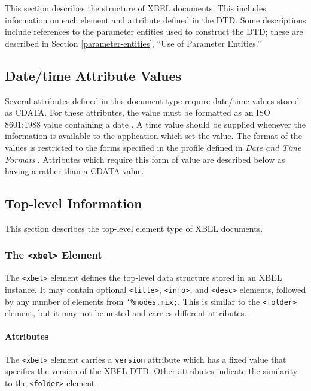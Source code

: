 \documentclass{howto}
\newcommand{\element}[1]{\texttt{<#1>}}
\newcommand{\attribute}[1]{\texttt{#1}}
\newcommand{\paramentity}[1]{\texttt{\char`\%#1;}}
\begin{document}
  This section describes the structure of XBEL documents.  This
  includes information on each element and attribute defined in the
  DTD.  Some descriptions include references to the parameter entities 
  used to construct the DTD; these are described in Section
  \ref{parameter-entities}, ``Use of Parameter Entities.''

  \subsection{Date/time Attribute Values
              \label{date-time}}

    Several attributes defined in this document type require date/time
    values stored as CDATA.  For these attributes, the value must be
    formatted as an ISO 8601:1988 value containing a date
    \cite{iso8601,iso8601-houston,iso8601-kuhn}.  A time value
    should be supplied whenever the information is available to the
    application which set the value.  The format of the values is
    restricted to the forms specified in the profile defined in
    \emph{Date and Time Formats} \cite{w3c-datetime}.  Attributes
    which require this form of value are described below as having a
     rather than a CDATA value.

  \subsection{Top-level Information
              \label{top-level}}

    This section describes the top-level element type of XBEL
    documents.

    \subsubsection{The \element{xbel} Element
                   \label{element-xbel}}

      The \element{xbel} element defines the top-level data structure
      stored in an XBEL instance.  It may contain optional
      \element{title}, \element{info}, and \element{desc} elements,
      followed by any number of elements from
      \paramentity{nodes.mix}.  This is similar to the
      \element{folder} element, but it may not be nested and carries
      different attributes.

      \paragraph*{Attributes}
        The \element{xbel} element carries a \attribute{version}
        attribute which has a fixed value that specifies the version
        of the XBEL DTD.  Other attributes indicate the similarity to
        the \element{folder} element.
\end{document}
